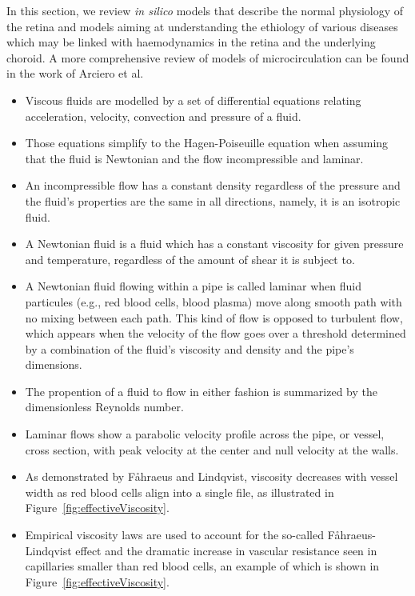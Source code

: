 \documentclass[12pt,a4paper]{journal}
\begin{document}
In this section, we review \textit{in silico} models that describe the normal physiology of the retina and models aiming at understanding the ethiology of various diseases which may be linked with haemodynamics in the retina and the underlying choroid.
A more comprehensive review of models of microcirculation can be found in the work of Arciero et al.~\cite{Arciero_2017}

\begin{tcolorbox}[title=Additional information -- Fluid flow modelling]
  \begin{itemize}
  \item Viscous fluids are modelled by a set of differential equations relating acceleration, velocity, convection and pressure of a fluid.
  \item Those equations simplify to the Hagen-Poiseuille equation when assuming that the fluid is Newtonian and the flow incompressible and laminar.
  \item An incompressible flow has a constant density regardless of the pressure and the fluid's properties are the same in all directions, namely, it is an isotropic fluid.
  \item A Newtonian fluid is a fluid which has a constant viscosity for given pressure and temperature, regardless of the amount of shear it is subject to.
  \item A Newtonian fluid flowing within a pipe is called laminar when fluid particules (e.g., red blood cells, blood plasma) move along smooth path with no mixing between each path.
    This kind of flow is opposed to turbulent flow, which appears when the velocity of the flow goes over a threshold determined by a combination of the fluid's viscosity and density and the pipe's dimensions.
  \item The propention of a fluid to flow in either fashion is summarized by the dimensionless Reynolds number.
  \item Laminar flows show a parabolic velocity profile across the pipe, or vessel, cross section, with peak velocity at the center and null velocity at the walls.
  \item As demonstrated by F\r ahraeus and Lindqvist, viscosity decreases with vessel width as red blood cells align into a single file, as illustrated in Figure~\ref{fig:effectiveViscosity}.~\cite{Faahraeus_1931}
  \item Empirical viscosity laws are used to account for the so-called F\r ahraeus-Lindqvist effect and the dramatic increase in vascular resistance seen in capillaries smaller than red blood cells, an example of which is shown in Figure~\ref{fig:effectiveViscosity}.~\cite{Haynes_1960,Pries_1990,Secomb_2013}
  \end{itemize}
\end{tcolorbox}
\end{document}
